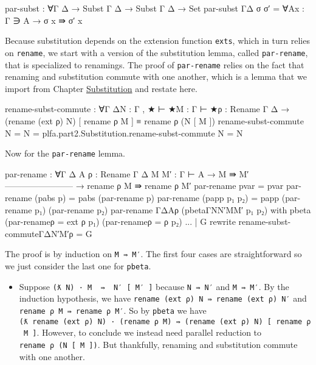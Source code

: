 \begin{fence}
\begin{code}
par-subst : ∀{Γ Δ} → Subst Γ Δ → Subst Γ Δ → Set
par-subst {Γ}{Δ} σ σ′ = ∀{A}{x : Γ ∋ A} → σ x ⇛ σ′ x
\end{code}
\end{fence}

Because substitution depends on the extension function \texttt{exts},
which in turn relies on \texttt{rename}, we start with a version of the
substitution lemma, called \texttt{par-rename}, that is specialized to
renamings. The proof of \texttt{par-rename} relies on the fact that
renaming and substitution commute with one another, which is a lemma
that we import from Chapter
\protect\hyperlink{Substitution}{Substitution} and restate here.

\begin{fence}
\begin{code}
rename-subst-commute : ∀{Γ Δ}{N : Γ , ★ ⊢ ★}{M : Γ ⊢ ★}{ρ : Rename Γ Δ }
    → (rename (ext ρ) N) [ rename ρ M ] ≡ rename ρ (N [ M ])
rename-subst-commute {N = N} = plfa.part2.Substitution.rename-subst-commute {N = N}
\end{code}
\end{fence}

Now for the \texttt{par-rename} lemma.

\begin{fence}
\begin{code}
par-rename : ∀{Γ Δ A} {ρ : Rename Γ Δ} {M M′ : Γ ⊢ A}
  → M ⇛ M′
    ------------------------
  → rename ρ M ⇛ rename ρ M′
par-rename pvar = pvar
par-rename (pabs p) = pabs (par-rename p)
par-rename (papp p₁ p₂) = papp (par-rename p₁) (par-rename p₂)
par-rename {Γ}{Δ}{A}{ρ} (pbeta{Γ}{N}{N′}{M}{M′} p₁ p₂)
    with pbeta (par-rename{ρ = ext ρ} p₁) (par-rename{ρ = ρ} p₂)
... | G rewrite rename-subst-commute{Γ}{Δ}{N′}{M′}{ρ} = G

\end{code}
\end{fence}

The proof is by induction on \texttt{M\ ⇛\ M′}. The first four cases are
straightforward so we just consider the last one for \texttt{pbeta}.

\begin{itemize}
\tightlist
\item
  Suppose \texttt{(ƛ\ N)\ ·\ M\ \ ⇛\ \ N′\ {[}\ M′\ {]}} because
  \texttt{N\ ⇛\ N′} and \texttt{M\ ⇛\ M′}. By the induction hypothesis,
  we have \texttt{rename\ (ext\ ρ)\ N\ ⇛\ rename\ (ext\ ρ)\ N′} and
  \texttt{rename\ ρ\ M\ ⇛\ rename\ ρ\ M′}. So by \texttt{pbeta} we have
  \texttt{(ƛ\ rename\ (ext\ ρ)\ N)\ ·\ (rename\ ρ\ M)\ ⇛\ (rename\ (ext\ ρ)\ N)\ {[}\ rename\ ρ\ M\ {]}}.
  However, to conclude we instead need parallel reduction to
  \texttt{rename\ ρ\ (N\ {[}\ M\ {]})}. But thankfully, renaming and
  substitution commute with one another.
\end{itemize}

